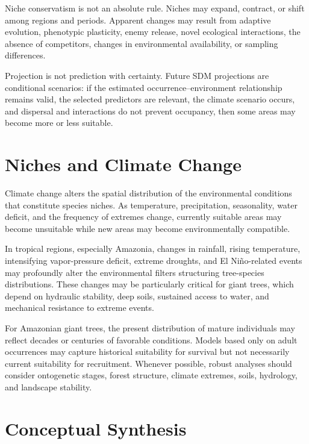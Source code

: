 Niche conservatism is not an absolute rule. Niches may expand, contract, or
shift among regions and periods. Apparent changes may result from adaptive
evolution, phenotypic plasticity, enemy release, novel ecological interactions,
the absence of competitors, changes in environmental availability, or sampling
differences.

\begin{atencao}
Projection is not prediction with certainty. Future SDM projections are
conditional scenarios: if the estimated occurrence--environment relationship
remains valid, the selected predictors are relevant, the climate scenario
occurs, and dispersal and interactions do not prevent occupancy, then some
areas may become more or less suitable.
\end{atencao}

\section{Niches and Climate Change}

Climate change alters the spatial distribution of the environmental conditions
that constitute species niches. As temperature, precipitation, seasonality,
water deficit, and the frequency of extremes change, currently suitable areas
may become unsuitable while new areas may become environmentally compatible.

In tropical regions, especially Amazonia, changes in rainfall, rising
temperature, intensifying vapor-pressure deficit, extreme droughts, and El
Niño-related events may profoundly alter the environmental filters structuring
tree-species distributions. These changes may be particularly critical for
giant trees, which depend on hydraulic stability, deep soils, sustained access
to water, and mechanical resistance to extreme events.

\begin{aplicacao}
For Amazonian giant trees, the present distribution of mature individuals may
reflect decades or centuries of favorable conditions. Models based only on
adult occurrences may capture historical suitability for survival but not
necessarily current suitability for recruitment. Whenever possible, robust
analyses should consider ontogenetic stages, forest structure, climate
extremes, soils, hydrology, and landscape stability.
\end{aplicacao}

\section{Conceptual Synthesis}

